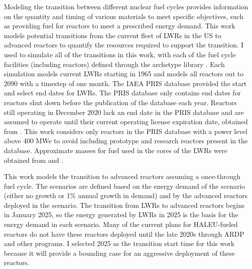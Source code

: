 Modeling the transition between different nuclear fuel cycles provides 
information on the quantity and timing of various materials to meet 
specific objectives, such as providing fuel for reactors to meet a 
prescribed energy demand. 
This work models potential transitions from the 
current fleet of \glspl{LWR} in the US to advanced reactors to quantify the 
resources required to support the transition. I used 
\Cyclus \cite{huff_fundamental_2016} to simulate all of the transitions 
in this 
work, with each of the fuel cycle facilities (including reactors) defined 
through the \Cycamore archetype library \cite{carlsen_cycamore_2014}. Each 
simulation models current 
\glspl{LWR} starting in 1965 and models all reactors out to 2090 with a timestep 
of one month. The \gls{IAEA} \gls{PRIS} database \cite{noauthor_power_1989} 
provided the start and select end dates for \glspl{LWR}. The \gls{PRIS} database 
only contains end dates for reactors shut down before the publication of the 
database each year. Reactors still operating in December 2020  
lack an end date in the \gls{PRIS} database and are assumed to operate 
until 
their current operating license expiration date, obtained from 
\cite{nei_us_2021}. This work considers only 
reactors in the \gls{PRIS} database with a power level above 400 MWe 
to avoid including prototype and research reactors present in the database. 
Approximate masses for fuel used in the cores of the \glspl{LWR} were obtained 
from \cite{todreas_nuclear_2012} and \cite{cacuci_handbook_2010}. 

This work models the transition to advanced reactors assuming a 
once-through fuel cycle. The scenarios are defined based 
on the energy demand 
of the scenario (either no growth or 1\% annual growth in demand) and by the 
advanced reactors deployed in the scenario. The transition from \glspl{LWR} 
to advanced reactors begins in January 2025, so the energy generated by 
\glspl{LWR} in 2025 is the basis for the energy demand in each scenario.  
Many of the 
current plans for \gls{HALEU}-fueled reactors do not have these reactors 
deployed until the late 2020s \cite{nichol_current_2021} through \gls{ARDP} 
and other programs. I selected 2025 as the transition 
start time for this work because it will provide a bounding case for 
an aggressive deployment of these reactors. 

